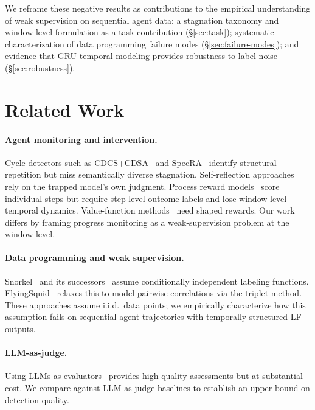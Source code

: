 \documentclass[11pt,a4paper]{article}
\begin{document}
We reframe these negative results as contributions to the empirical understanding of weak supervision on sequential agent data:
a stagnation taxonomy and window-level formulation as a task contribution (\S\ref{sec:task});
systematic characterization of data programming failure modes (\S\ref{sec:failure-modes});
and evidence that GRU temporal modeling provides robustness to label noise (\S\ref{sec:robustness}).

\section{Related Work}

\paragraph{Agent monitoring and intervention.}
Cycle detectors such as CDCS+CDSA~\cite{cycles2024} and SpecRA~\cite{specra2024} identify structural repetition but miss semantically diverse stagnation.
Self-reflection approaches~\cite{shinn2023reflexion,yao2024tree} rely on the trapped model's own judgment.
Process reward models~\cite{lightman2023lets,wang2024math} score individual steps but require step-level outcome labels and lose window-level temporal dynamics.
Value-function methods~\cite{le2022coderl} need shaped rewards.
Our work differs by framing progress monitoring as a weak-supervision problem at the window level.

\paragraph{Data programming and weak supervision.}
Snorkel~\cite{ratner2017snorkel} and its successors~\cite{fu2020fast,shin2022universalizing} assume conditionally independent labeling functions.
FlyingSquid~\cite{fu2020fast} relaxes this to model pairwise correlations via the triplet method.
These approaches assume i.i.d.\ data points; we empirically characterize how this assumption fails on sequential agent trajectories with temporally structured LF outputs.

\paragraph{LLM-as-judge.}
Using LLMs as evaluators~\cite{zheng2024judging} provides high-quality assessments but at substantial cost.
We compare against LLM-as-judge baselines to establish an upper bound on detection quality.
\end{document}
